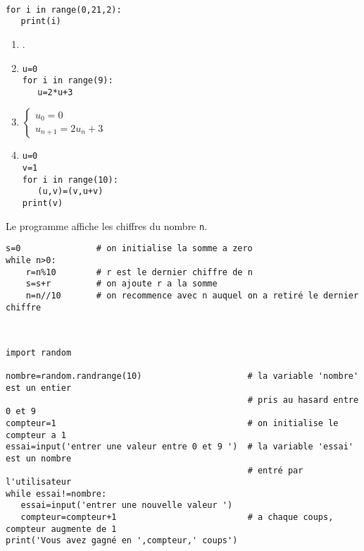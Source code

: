  \begin{solution}~\\
 \vspace{-1cm}
 \begin{verbatim}
for i in range(0,21,2):
   print(i)
\end{verbatim}
\end{solution}
\bigskip


\begin{solution}
\begin{enumerate}
\item .
\item \begin{verbatim}
u=0
for i in range(9):
   u=2*u+3
\end{verbatim}
\item 
$\left\lbrace\begin{array}{l}
u_0=0\\
u_{n+1}=2u_n+3
\end{array}\right.$
\item 
\begin{verbatim}
u=0
v=1
for i in range(10):
   (u,v)=(v,u+v)
print(v)	
\end{verbatim}
\end{enumerate}
\end{solution}
\bigskip


\begin{solution}
Le programme affiche les chiffres du nombre \verb?n?.
\begin{verbatim}
s=0               # on initialise la somme a zero
while n>0:
    r=n%10        # r est le dernier chiffre de n
    s=s+r         # on ajoute r a la somme        
    n=n//10       # on recommence avec n auquel on a retiré le dernier chiffre
\end{verbatim}
\end{solution}


\newpage


\begin{solution}~\\
\vspace{-1cm}
\begin{verbatim}
import random

nombre=random.randrange(10)                     # la variable 'nombre' est un entier 
                                                # pris au hasard entre 0 et 9
compteur=1                                      # on initialise le compteur a 1              
essai=input('entrer une valeur entre 0 et 9 ')  # la variable 'essai' est un nombre 
                                                # entré par l'utilisateur
while essai!=nombre:
   essai=input('entrer une nouvelle valeur ')
   compteur=compteur+1                          # a chaque coups, compteur augmente de 1
print('Vous avez gagné en ',compteur,' coups')	
\end{verbatim}
\end{solution}
\bigskip


